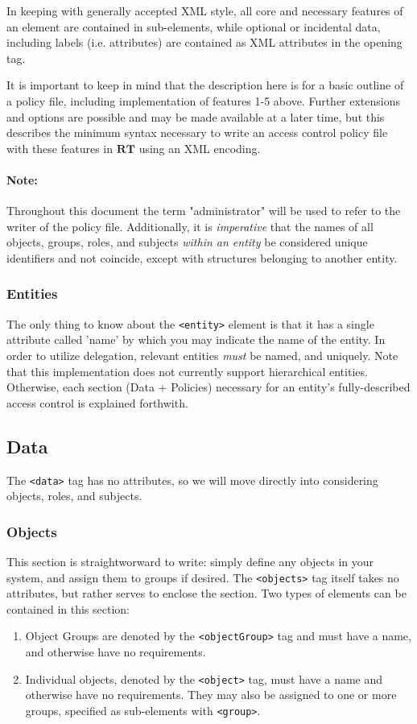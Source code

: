 \documentclass{article}
\providecommand{\tightlist}{
    \setlength{\itemsep}{1pt}\setlength{\parskip}{0pt}
}
\providecommand{\inlinecode}{\texttt}
\providecommand{\RT}{\textbf{RT}}
\begin{document}
In keeping with generally accepted XML style, all core and necessary features of an element are contained in sub-elements, while optional or incidental data, including labels (i.e. attributes) are contained as XML attributes in the opening tag. \par

It is important to keep in mind that the description here is for a basic outline of a policy file, including implementation of features 1-5 above. Further extensions and options are possible and may be made available at a later time, but this describes the minimum syntax necessary to write an access control policy file with these features in $\RT$ using an XML encoding.

\paragraph{Note:} Throughout this document the term "administrator" will be used to refer to the writer of the policy file. Additionally, it is \textit{imperative} that the names of all objects, groups, roles, and subjects \textit{within an entity} be considered unique identifiers and not coincide, except with structures belonging to another entity.


\subsubsection{Entities}
The only thing to know about the \inlinecode{<entity>} element is that it has a single attribute called 'name' by which you may indicate the name of the entity. In order to utilize delegation, relevant entities \textit{must} be named, and uniquely. Note that this implementation does not currently support hierarchical entities. Otherwise, each section (Data + Policies) necessary for an entity's fully-described access control is explained forthwith.

\subsection{Data}
The \inlinecode{<data>} tag has no attributes, so we will move directly into considering objects, roles, and subjects.

\subsubsection{Objects}
This section is straightworward to write: simply define any objects in your system, and assign them to groups if desired.
The \inlinecode{<objects>} tag itself takes no attributes, but rather serves to enclose the section. Two types of elements can be contained in this section:
\begin{enumerate}\tightlist
  \item Object Groups are denoted by the \inlinecode{<objectGroup>} tag and must have a name, and otherwise have no requirements.
  \item Individual objects, denoted by the \inlinecode{<object>} tag, must have a name and otherwise have no requirements. They may also be assigned to one or more groups, specified as sub-elements with \inlinecode{<group>}.
\end{enumerate}
\end{document}
